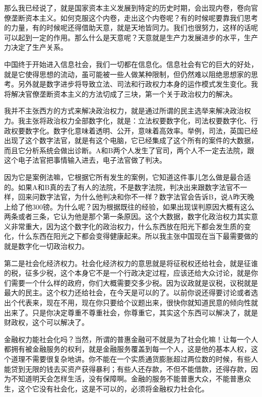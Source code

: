 \documentclass[UTF8, 12pt, a4paper]{ctexrep}
\begin{document}
那么我已经说了，就是国家资本主义发展到特定的历史时期，会出现内卷，卷向官僚垄断资本主义。如何克服这个内卷，走出这个内卷呢？有的时候呢要靠我们思考的力量，有的时候呢还得借助天意，就是天地皆同力。我们也很努力，这样的话呢可以起到一定的作用。那么什么是天意呢？天意就是生产力发展进步的水平，生产力决定了生产关系。

中国终于开始进入信息社会，我们一切都在信息化。信息社会有它的巨大的好处，就是它使得思想的流动，虽可能被一些人做某种限制，但仍然难以阻绝思想家的思考。另外就是数字进步将导致立法、司法和行政权力本身的运作模式发生变化。我将解决官僚垄断资本主义的方法切成了三块，第一个关于政治权力的解决。

我并不主张西方的方式来解决政治权力，就是通过所谓的民主选举来解决政治权力。我主张将政治权力全部数字化，就是：立法权要数字化，司法权要数字化、行政权要数字化。数字化意味着透明、公开，意味着高效率。举例，司法，英国已经出现了这个数字法官，就是有这个电脑，它已经集成了这个所有的案件的大数据，而且它分析系统会做出诊断。A和B两个人发生了官司，两个人不一定去法院，跟这个电子法官把事情输入进去，电子法官做了判决。

因为它是案例法嘛，它根据它所有发生的案例，它知道这件事儿怎么做是最合适的。如果A和B真的去了有人的法院，不是数字法院，判决出来跟数字法官不一样，回来问数字法官，为什么他判决和你不一样？数字法官会告诉B，说A昨天晚上给了他300镑。为什么呢？因为根据既往的经验，如果出现误判原因大概有这么两条或者三条，它认为他是那个第一条原因。这个大数据，数字化政治权力其实意义非常重大，因为这个数字化的政治权力，什么东西放在阳光下都会发生质的变化，什么东西在阳光之下都会变得健康起来。所以我主张中国现在当下最需要做的就是数字化一切政治权力。

第二是社会化经济权力。社会化经济权力的意思就是将征税权还给社会，就是征谁的税，征多少税，这个本身它不是一个行政决定过程，应该还给大众讨论，就是你们需要一个什么样的政府，你们大概需要交多少税。因为议政就是议税，议税就是最大的民主。这个权力还给社会，在今天是可以的了。以前你说还得要讨论或者选出个代表来，现在不用，现在你只要给个议题出来，很快你就知道民意的倾向性就出来了。只是你决定尊重不尊重社会，你尊重它，其实这个东西可以解决了，就是财政权，这个可以解决了。

金融权力能社会化吗？当然，所谓的普惠金融可不就是为了社会化嘛！让每一个人都拥有被金融服务的权利，就是金融服务覆盖到每一个人，这是他的基本人权，这个道理不需要很复杂地讲。你不能在一个实质通货膨胀超过两位数的时候，有些人能贷到无限的钱去买资产获得暴利；有些人还存款，不但不能借款，还得存款，因为不知道明天会怎样生活，没有保障啊。金融的服务不能普惠大众，不能普惠众生，这个它没有社会化，这是不可以的，必须将金融权力社会化。
\end{document}
